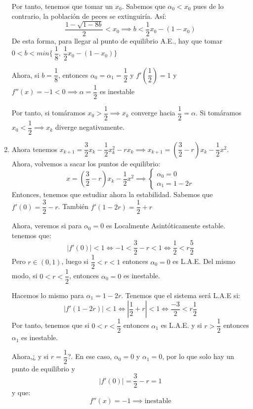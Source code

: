 \begin{ejemplo}
\begin{enumerate}
	Por tanto, tenemos que tomar un $x_0$. Sabemos que $\alpha_0 < x_0$ pues de lo contrario, la población de peces se extinguiría. Así:
	\[
	\frac{1 - \sqrt{1-8b}}{2} < x_0 \implies b < \dfrac{1}{2}x_0 -(1-x_0)
	\]
	De esta forma, para llegar al punto de equilibrio A.E., hay que tomar $0 < b < min\{\ \dfrac{1}{8},\ \dfrac{1}{2}x_0 -(1-x_0) \}$

	Ahora, si $b= \dfrac{1}{8}$, entonces $\alpha_0 = \alpha_1 = \dfrac{1}{2}$ y $f'(\dfrac{1}{2}) = 1$ y $f''(x) = -1 < 0 \implies \alpha= \dfrac{1}{2}$ es inestable

	Por tanto, si tomáramos $x_0 > \dfrac{1}{2} \implies x_k$ converge hacia $\dfrac{1}{2} = \alpha$.
	Si tomáramos $x_0 < \dfrac{1}{2} \implies x_k$ diverge negativamente.

	\item Ahora tenemos $x_{k+1}= \dfrac{3}{2}x_k - \dfrac{1}{2} x_k^2 -rx_k \implies x_{k+1} = (\dfrac{3}{2}-r)x_k - \dfrac{1}{2}x^2$.
	Ahora, volvemos a sacar los puntos de equilibrio:
	\[
	x = (\dfrac{3}{2}-r)x_k - \dfrac{1}{2}x^2 \implies \begin{cases}
	\alpha_0 = 0\\
	\alpha_1 = 1-2r
\end{cases}
	\]
	Entonces, tenemos que estudiar ahora la estabilidad. Sabemos que $f'(0) = \dfrac{3}{2} -r$. También $f'(1-2r) = \dfrac{1}{2} + r$

	Ahora, veremos si para $\alpha_0 = 0$ es Localmente Asintóticamente estable. tenemos que:
	\[
	|f'(0)|<1 \iff -1 < \dfrac{3}{2}-r < 1 \iff \dfrac{1}{2} < r \dfrac{5}{2}
	\]
	Pero $r \in (0,1)$, luego si $\dfrac{1}{2} < r < 1$ entonces $\alpha_0 = 0$ es L.A.E. Del mismo modo, si $0 < r < \dfrac{1}{2}$, entonces $\alpha_0 = 0$ es inestable.

	Hacemos lo mismo para $\alpha_1 = 1-2r$.  Tenemos que el sistema será L.A.E si:
	\[
	|f'(1-2r)| < 1 \iff |\dfrac{1}{2}+r| < 1 \iff \dfrac{-3}{2} < r \dfrac{1}{2}
	\]
	Por tanto, tenemos que si $0 < r < \dfrac{1}{2}$ entonces $\alpha_1$ es L.A.E. y si $r> \dfrac{1}{2}$ entonces $\alpha_1$ es inestable.

	Ahora,¿ y si $r= \dfrac{1}{2}$?. En ese caso, $\alpha_0 = 0$ y $\alpha_1 = 0$, por lo que solo hay un punto de equilibrio y
	\[
	|f'(0)|= \dfrac{3}{2}-r = 1
	\]
	y que:
	\[
	f''(x) =  -1 \implies \text{inestable}
	\]
\end{enumerate}
\end{ejemplo}



